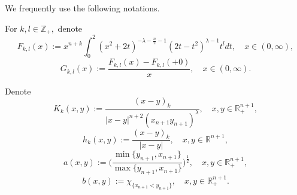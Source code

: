 \documentclass[12pt]{amsart}
\begin{document}
We frequently use the following notations.
\begin{nota}\label{fkl notation} For $k,l\in\mathbb{Z}_+,$ denote
$$F_{k,l}(x):=x^{n+k}\int_0^2(x^2+2t)^{-\lambda-\frac{n}{2}-1}(2t-t^2)^{\lambda-1}t^ldt,\quad x\in(0,\infty),$$
$$G_{k,l}(x):=\frac{F_{k,l}(x)-F_{k,l}(+0)}{x},\quad x\in(0,\infty).$$	
\end{nota}

\begin{nota} Denote
$$K_k(x,y):=\frac{(x-y)_k}{|x-y|^{n+2}(x_{n+1}y_{n+1})^{\lambda}},\quad x,y\in\mathbb{R}^{n+1}_+,$$	
$$h_k(x,y):=\frac{(x-y)_k}{|x-y|},\quad x,y\in\mathbb{R}^{n+1},$$
$$a(x,y):=\bigg(\frac{\min\{y_{n+1},x_{n+1}\}}{\max\{y_{n+1},x_{n+1}\}}\bigg)^{\frac12},\quad x,y\in\mathbb{R}^{n+1}_+,$$
$$b(x,y):=\chi_{\{x_{n+1}<y_{n+1}\}},\quad x,y\in\mathbb{R}^{n+1}_+.$$
\end{nota}
\end{document}
